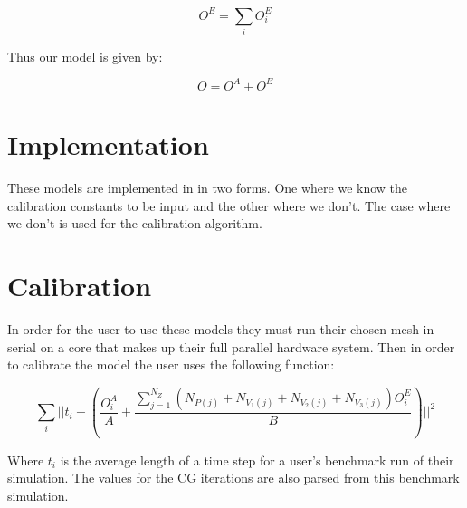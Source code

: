 \begin{equation}
O^E = \sum_i O^E_i
\end{equation}

Thus our model is given by:

\begin{equation}
O = O^A + O^E
\end{equation}

\section{Implementation}
These models are implemented in  in two forms. One where we know the calibration constants to be input and the other where we don't. The case where we don't is used for the calibration algorithm.

\section{Calibration}
In order for the user to use these models they must run their chosen mesh in serial on a core that makes up their full parallel hardware system. Then in order to calibrate the model the user uses the following function: 

\begin{equation}
\sum_i \Bigg|\Bigg| t_i - \left(\frac{O^A_i}{A} + \frac{\sum_{j=1}^{N_Z} (N_{P (j)} + N_{V_1 (j)} + N_{V_2 (j)} + N_{V_3 (j)}) O^E_i}{B}\right) \Bigg|\Bigg|^2
\end{equation}

Where \(t_i\) is the average length of a time step for a user's benchmark run of their simulation. The values for the CG iterations are also parsed from this benchmark simulation.






